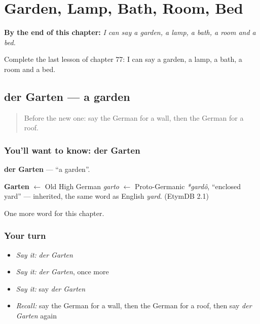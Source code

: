 
\chapter{Garden, Lamp, Bath, Room, Bed}
\label{ch:ge-garden-lamp-bath-room-bed}

\begin{chapteropening}
\textbf{By the end of this chapter:} \emph{I can say a garden, a lamp, a bath, a room and a bed.}

Complete the last lesson of chapter 77: I can say a garden, a lamp, a bath, a room and a bed.
\end{chapteropening}

\section[der Garten]{der Garten — a garden}

\label{lesson:GE-C77-garten}



\begin{quote}
Before the new one: say the German for a wall, then the German for a roof.
\end{quote}

\subsection*{You'll want to know: der Garten}
\textbf{der Garten} — \textquotedblleft{}a garden\textquotedblright{}.

\begin{cousinweb}
\textbf{Garten} $\leftarrow$ Old High German \emph{garto} $\leftarrow$ Proto-Germanic \emph{*gardô}, \textquotedblleft{}enclosed yard\textquotedblright{} — inherited, the same word as English \emph{yard}. (EtymDB 2.1)
\end{cousinweb}

\begin{grammarlens}[title={What you've built}]
One more word for this chapter.
\end{grammarlens}

\subsection*{Your turn}
\begin{itemize}
\raggedright
  \item \emph{Say it:} \emph{der Garten}
  \item \emph{Say it:} \emph{der Garten}, once more
  \item \emph{Say it:} say \emph{der Garten}
  \item \emph{Recall:} say the German for a wall, then the German for a roof, then say \emph{der Garten} again
\end{itemize}

